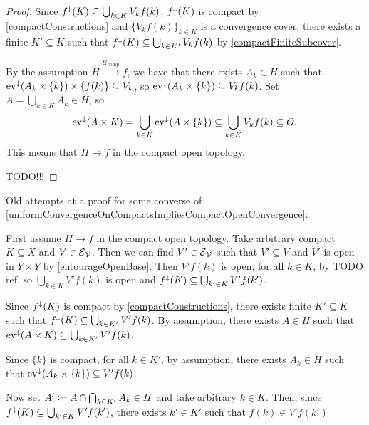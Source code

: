 \begin{proof}
Since $f^\downarrow(K) \subseteq \bigcup_{k\in K}V_kf(k)$, $f^\downarrow(K)$ is compact by \ref{compactConstructions} and $\{V_kf(k)\}_{k\in K}$ is a convergence cover, there exists a finite $K'\subseteq K$ such that $f^\downarrow(K)\subseteq \bigcup_{k\in K'}V_kf(k)$ by \ref{compactFiniteSubcover}.


By the assumption $H \overset{\mathcal{U}_\text{comp}}{\longrightarrow} f$, we have that there exists $A_k\in H$ such that $\operatorname{ev}^\downarrow(A_k\times \{k\}) \times \{f(k)\} \subseteq V_k$, so $\operatorname{ev}^\downarrow(A_k\times \{k\}) \subseteq V_kf(k)$. Set $A = \bigcup_{k\in K}A_k \in H$, so
\[ \operatorname{ev}^\downarrow(A\times K) = \bigcup_{k\in K}\operatorname{ev}^\downarrow(A\times \{k\}) \subseteq \bigcup_{k\in K}V_kf(k) \subseteq O. \]
This means that $H\to f$ in the compact open topology.

TODO!!!
\end{proof}

\begin{note}
Old attempts at a proof for some converse of \ref{uniformConvergenceOnCompactsImpliesCompactOpenConvergence}: 

First assume $H\to f$ in the compact open topology. Take arbitrary compact $K\subseteq X$ and $V\in \operatorname{\mathcal{E}}_{\mathcal{V}}$. Then we can find $V'\in \operatorname{\mathcal{E}}_{\mathcal{V}}$ such that $V'\subseteq V$ and $V'$ is open in $Y\times Y$ by \ref{entourageOpenBase}. Then $V'f(k)$ is open, for all $k\in K$, by TODO ref, so $\bigcup_{k\in K}V'f(k)$ is open and $f^\downarrow(K)\subseteq \bigcup_{k'\in K}V'f(k')$.

Since $f^\downarrow(K)$ is compact by \ref{compactConstructions}, there exists finite $K'\subseteq K$ such that $f^\downarrow(K)\subseteq \bigcup_{k\in K'}V'f(k)$. By assumption, there exists $A\in H$ such that $\operatorname{ev}^\downarrow(A\times K) \subseteq \bigcup_{k\in K'}V'f(k)$.

Since $\{k\}$ is compact, for all $k\in K'$, by assumption, there exists $A_k\in H$ such that $\operatorname{ev}^\downarrow(A_k\times \{k\}) \subseteq V'f(k)$.

Now set $A' \coloneqq A\cap \bigcap_{k\in K'}A_k \in H$ and take arbitrary $k\in K$. Then, since $f^\downarrow(K)\subseteq \bigcup_{k'\in K}V'f(k')$, there exists $k'\in K'$ such that $f(k) \in V'f(k')$




\end{note}

